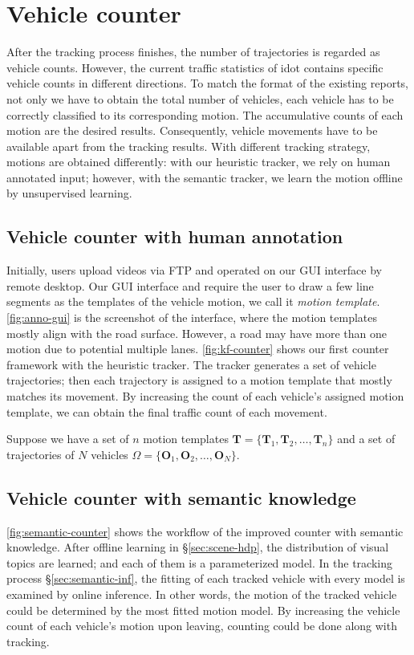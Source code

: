\section{Vehicle counter}
\label{sec:system-counter}

After the tracking process finishes, the number of trajectories is regarded as vehicle counts.
However, the current traffic statistics of \gls{idot} contains specific vehicle counts in different directions. 
To match the format of the existing reports, not only we have to obtain the total number of vehicles, each vehicle has to be correctly classified to its corresponding motion. 
The accumulative counts of each motion are the desired results.
Consequently, vehicle movements have to be available apart from the tracking results.
With different tracking strategy, motions are obtained differently: with our heuristic tracker, we rely on human annotated input; however, with the semantic tracker, we learn the motion offline by unsupervised learning.

\subsection{Vehicle counter with human annotation}
Initially, users upload videos via FTP and operated on our GUI interface by remote desktop.
Our GUI interface and require the user to draw a few line segments as the templates of the vehicle motion, we call it \emph{motion template}.
\ref{fig:anno-gui} is the screenshot of the interface, where the motion templates mostly align with the road surface. 
However, a road may have more than one motion due to potential multiple lanes. 
\ref{fig:kf-counter} shows our first counter framework with the heuristic tracker. 
The tracker generates a set of vehicle trajectories; then each trajectory is assigned to a motion template that mostly matches its movement. 
By increasing the count of each vehicle's assigned motion template, we can obtain the final traffic count of each movement. 

Suppose we have a set of $n$ motion templates $\mathbf{T} = \{\mathbf{T}_1, \mathbf{T}_2, \dots, \mathbf{T}_n\}$ and a set of trajectories of $N$ vehicles $\Omega= \{\mathbf{O}_1, \mathbf{O}_2, \dots, \mathbf{O}_N\}$.




\subsection{Vehicle counter with semantic knowledge}
\ref{fig:semantic-counter} shows the workflow of the improved counter with semantic knowledge. 
After offline learning in \S\ref{sec:scene-hdp}, the distribution of visual topics are learned; and each of them is a parameterized model.
In the tracking process \S\ref{sec:semantic-inf}, the fitting of each tracked vehicle with every model is examined by online inference.
In other words, the motion of the tracked vehicle could be determined by the most fitted motion model. 
By increasing the vehicle count of each vehicle's motion upon leaving, counting could be done along with tracking. 

